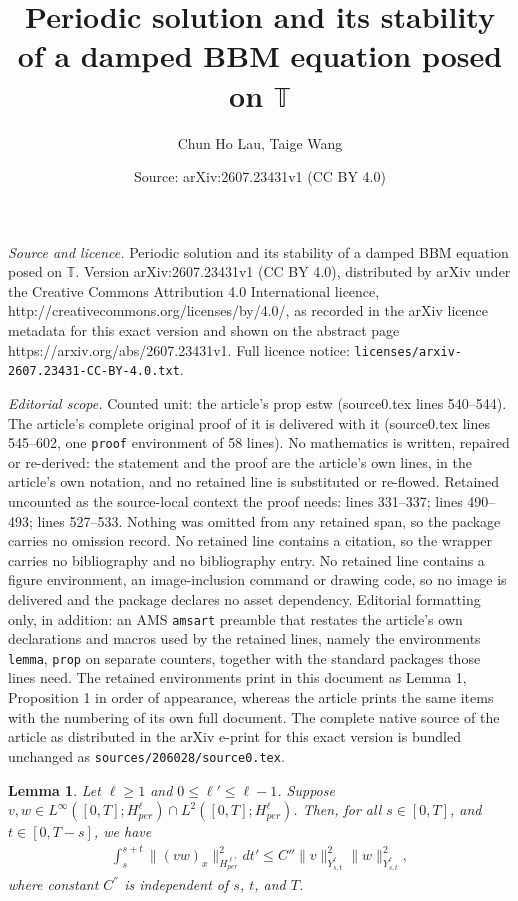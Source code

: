 \documentclass[10pt,a4paper]{amsart}
\title{Periodic solution and its stability of a damped BBM equation posed on $\mathbb{T}$}
\author{Chun Ho Lau, Taige Wang}
\date{Source: arXiv:2607.23431v1 (CC BY 4.0)}
\newtheorem{lemma}{Lemma}
\begin{document}
\maketitle

\noindent\emph{Source and licence.} Periodic solution and its stability of a damped BBM equation posed on $\mathbb{T}$. Version arXiv:2607.23431v1 (CC BY 4.0), distributed by arXiv under the Creative Commons Attribution 4.0 International licence, http://creativecommons.org/licenses/by/4.0/, as recorded in the arXiv licence metadata for this exact version and shown on the abstract page https://arxiv.org/abs/2607.23431v1. Full licence notice: \texttt{licenses/arxiv-2607.23431-CC-BY-4.0.txt}.\par\smallskip

\noindent\textit{Editorial scope.} Counted unit: the article's prop estw (source0.tex lines 540--544). The article's complete original proof of it is delivered with it (source0.tex lines 545--602, one \texttt{proof} environment of 58 lines). No mathematics is written, repaired or re-derived: the statement and the proof are the article's own lines, in the article's own notation, and no retained line is substituted or re-flowed.  Retained uncounted as the source-local context the proof needs: lines 331--337; lines 490--493; lines 527--533.  Nothing was omitted from any retained span, so the package carries no omission record.  No retained line contains a citation, so the wrapper carries no bibliography and no bibliography entry.  No retained line contains a figure environment, an image-inclusion command or drawing code, so no image is delivered and the package declares no asset dependency.  Editorial formatting only, in addition: an AMS \texttt{amsart} preamble that restates the article's own declarations and macros used by the retained lines, namely the environments \texttt{lemma}, \texttt{prop} on separate counters, together with the standard packages those lines need.  The retained environments print in this document as Lemma 1, Proposition 1 in order of appearance, whereas the article prints the same items with the numbering of its own full document.  The complete native source of the article as distributed in the arXiv e-print for this exact version is bundled unchanged as \texttt{sources/206028/source0.tex}.
\begin{lemma} \label{bilinear}
    Let $\ell\geq 1$ and $0\leq \ell'\leq \ell-1$. Suppose $v,w\in L^{\infty}([0,T]; H^\ell_{per})\cap L^2([0,T]; H^\ell_{per})$. Then, for all $s\in [0,T]$, and $t\in [0,T-s]$, we have 
     \begin{align*}
        \int_s^{s+t}\|(vw)_x\|_{H^{\ell'}_{per}}^2dt'\leq C'' \|v\|_{Y^{\ell}_{s,t}}^2\|w\|_{Y^{\ell}_{s,t}}^2,
    \end{align*}
    where constant $C^{''}$ is independent of $s$, $t$, and $T$.
\end{lemma}
\end{document}
